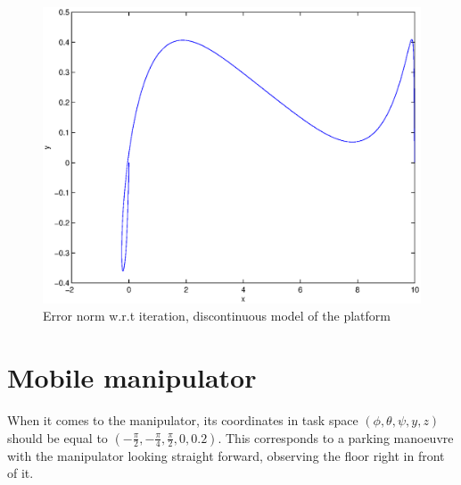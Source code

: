 \begin{figure}[htp]
\centering
\includegraphics[height=0.3\textheight]{img/final_15_1_10_path.eps} %
\caption{Error norm w.r.t iteration, discontinuous model of the platform}
\label{fig:error_discont}
\end{figure}

\section{Mobile manipulator}

When it comes to the manipulator,
its coordinates in task space $(\phi, \theta, \psi, y, z) $ should be equal to
$(-\frac{\pi}{2}, -\frac{\pi}{4}, \frac{\pi}{2}, 0, 0.2)$.
This corresponds to a parking manoeuvre with the manipulator
looking straight forward, observing the floor right in front of it.
